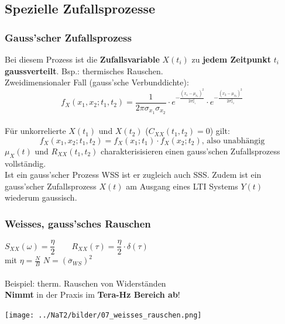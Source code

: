 \subsection{Spezielle Zufallsprozesse }
\subsubsection{Gauss'scher Zufallsprozess }
Bei diesem Prozess ist die \textbf{Zufallsvariable} $X(t_{i})$ zu \textbf{jedem Zeitpunkt} $t_{i}$
\textbf{gaussverteilt}. Bsp.: thermisches Rauschen. \\
Zweidimensionaler Fall (gauss'sche Verbunddichte): 
       $$f_{X}(x_{1},x_{2};t_{1},t_{2}) = \frac{1}{2\pi \sigma_{x_{1}}\sigma_{x_{2}}} \cdot
                                      e^{-\frac{(x_{1}-\mu_{x_{1}})^{2}}{2 \sigma^{2}_{x_{1}}}} \cdot
                                      e^{-\frac{(x_{2}-\mu_{x_{2}})^{2}}{2 \sigma^{2}_{x_{2}}}}$$ \\
Für unkorrelierte $X(t_{1})$ und $X(t_{2})$  ($C_{XX}(t_{1},t_{2})=0$) gilt:
        $$f_{X}(x_{1},x_{2}; t_{1},t_{2}) = f_{X}(x_{1};t_{1}) \cdot f_{X}(x_{2};t_{2}) \text{, also unabhängig} $$
$\mu_{X}(t)$ und $R_{XX}(t_{1}, t_{2})$ charakterisisieren einen gauss'schen Zufallsprozess
        vollst\"andig. \\
Ist ein gauss'scher Prozess WSS ist er zugleich auch SSS. Zudem ist ein gauss'scher
Zufallsprozess $X(t)$ am Ausgang eines LTI Systems $Y(t)$ wiederum gaussisch.

\subsubsection{Weisses, gauss'sches Rauschen  }
\begin{center}
	\begin{minipage}{8cm}
		$S_{XX}(\omega) = \dfrac{\eta}{2} \qquad R_{XX}(\tau) = \dfrac{\eta}{2} \cdot \delta(\tau)$ \\ mit $\eta = \frac{N}{B}$ \qquad $N = (\overline{\sigma}_{WS})^2$\\ \\
		Beispiel: therm. Rauschen von Widerständen \\
		\textbf{Nimmt} in der Praxis im \textbf{Tera-Hz Bereich ab}!
  	\end{minipage}
	\begin{minipage}{10cm}
		\texttt{[image: ../NaT2/bilder/07\_weisses\_rauschen.png]}
  	\end{minipage}
\end{center}

